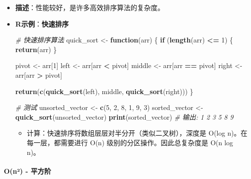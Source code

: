 \documentclass[
]{book}
\newenvironment{Shaded}{\begin{snugshade}}{\end{snugshade}}
\newcommand{\CommentTok}[1]{\textcolor[rgb]{0.56,0.35,0.01}{\textit{#1}}}
\newcommand{\ControlFlowTok}[1]{\textcolor[rgb]{0.13,0.29,0.53}{\textbf{#1}}}
\newcommand{\DecValTok}[1]{\textcolor[rgb]{0.00,0.00,0.81}{#1}}
\newcommand{\FunctionTok}[1]{\textcolor[rgb]{0.13,0.29,0.53}{\textbf{#1}}}
\newcommand{\NormalTok}[1]{#1}
\newcommand{\OtherTok}[1]{\textcolor[rgb]{0.56,0.35,0.01}{#1}}
\newcommand{\SpecialCharTok}[1]{\textcolor[rgb]{0.81,0.36,0.00}{\textbf{#1}}}
\providecommand{\tightlist}{%
  \setlength{\itemsep}{0pt}\setlength{\parskip}{0pt}}
\begin{document}
\begin{itemize}
\item
  \textbf{描述}：性能较好，是许多高效排序算法的复杂度。
\item
  \textbf{R示例}：\textbf{快速排序}

\begin{Shaded}
\begin{Highlighting}[]
\CommentTok{\# 快速排序算法}
\NormalTok{quick\_sort }\OtherTok{\textless{}{-}} \ControlFlowTok{function}\NormalTok{(arr) \{}
  \ControlFlowTok{if}\NormalTok{ (}\FunctionTok{length}\NormalTok{(arr) }\SpecialCharTok{\textless{}=} \DecValTok{1}\NormalTok{) \{}
    \FunctionTok{return}\NormalTok{(arr)}
\NormalTok{  \}}

\NormalTok{  pivot }\OtherTok{\textless{}{-}}\NormalTok{ arr[}\DecValTok{1}\NormalTok{]}
\NormalTok{  left }\OtherTok{\textless{}{-}}\NormalTok{ arr[arr }\SpecialCharTok{\textless{}}\NormalTok{ pivot]}
\NormalTok{  middle }\OtherTok{\textless{}{-}}\NormalTok{ arr[arr }\SpecialCharTok{==}\NormalTok{ pivot]}
\NormalTok{  right }\OtherTok{\textless{}{-}}\NormalTok{ arr[arr }\SpecialCharTok{\textgreater{}}\NormalTok{ pivot]}

  \FunctionTok{return}\NormalTok{(}\FunctionTok{c}\NormalTok{(}\FunctionTok{quick\_sort}\NormalTok{(left), middle, }\FunctionTok{quick\_sort}\NormalTok{(right)))}
\NormalTok{\}}

\CommentTok{\# 测试}
\NormalTok{unsorted\_vector }\OtherTok{\textless{}{-}} \FunctionTok{c}\NormalTok{(}\DecValTok{5}\NormalTok{, }\DecValTok{2}\NormalTok{, }\DecValTok{8}\NormalTok{, }\DecValTok{1}\NormalTok{, }\DecValTok{9}\NormalTok{, }\DecValTok{3}\NormalTok{)}
\NormalTok{sorted\_vector }\OtherTok{\textless{}{-}} \FunctionTok{quick\_sort}\NormalTok{(unsorted\_vector)}
\FunctionTok{print}\NormalTok{(sorted\_vector)  }\CommentTok{\# 输出: 1 2 3 5 8 9}
\end{Highlighting}
\end{Shaded}

  \begin{itemize}
  \tightlist
  \item
    计算：快速排序将数组层层对半分开（类似二叉树），深度是 O(log n)。在每一层，都需要进行 O(n) 级别的分区操作。因此总复杂度是 O(n log n)。
  \end{itemize}
\end{itemize}

\hypertarget{onuxb2---ux5e73ux65b9ux9636}{%
\paragraph{O(n²) - 平方阶}\label{onuxb2---ux5e73ux65b9ux9636}}
\end{document}
